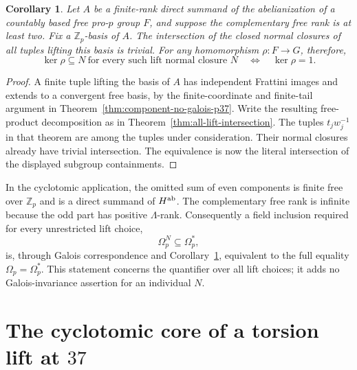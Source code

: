 \documentclass[11pt]{article}
\newtheorem{corollary}[theorem]{Corollary}
\theoremstyle{definition}\newtheorem{definition}[theorem]{Definition}
\begin{document}
\begin{corollary}\label{cor:all-lifts-faithfulness}
Let $A$ be a finite-rank direct summand of the abelianization
of a countably based free pro-$p$ group $F$, and suppose the
complementary free rank is at least two.  Fix a
$\mathbb Z_p$-basis of $A$.  The intersection of the closed
normal closures of all tuples lifting this basis is trivial.
For any homomorphism $\rho:F\to G$, therefore,
\[
 \ker\rho\subseteq N\ \text{for every such lift normal closure }N
       \quad\Longleftrightarrow\quad \ker\rho=1.
\]
\end{corollary}

\begin{proof}
A finite tuple lifting the basis of $A$ has independent
Frattini images and extends to a convergent free basis, by
the finite-coordinate and finite-tail argument in
Theorem~\ref{thm:component-no-galois-p37}.
Write the resulting free-product decomposition as in
Theorem~\ref{thm:all-lift-intersection}.  The tuples
$t_jw_j^{-1}$ in that theorem are among the tuples under
consideration.  Their normal closures already have trivial
intersection.  The equivalence is now the literal
intersection of the displayed subgroup containments.
\end{proof}

In the cyclotomic application, the omitted sum of even
components is finite free over $\mathbb Z_p$ and is a direct
summand of $H^{\rm ab}$.  The complementary free rank is
infinite because the odd part has positive $\Lambda$-rank.
Consequently a field inclusion required for every unrestricted
lift choice,
\[
                   \Omega_p^N\subseteq\Omega_p^*,
\]
is, through Galois correspondence and
Corollary~\ref{cor:all-lifts-faithfulness}, equivalent to the
full equality $\Omega_p=\Omega_p^*$.
This statement concerns the quantifier over all lift choices;
it adds no Galois-invariance assertion for an individual $N$.


\section{The cyclotomic core of a torsion lift at \(37\)}
\label{sec:p37-core}
\end{document}
